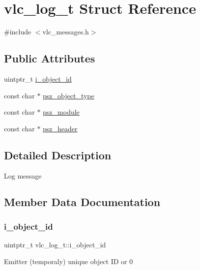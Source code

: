 \hypertarget{structvlc__log__t}{}\section{vlc\+\_\+log\+\_\+t Struct Reference}
\label{structvlc__log__t}


{\ttfamily \#include $<$vlc\+\_\+messages.\+h$>$}

\subsection*{Public Attributes}
\begin{DoxyCompactItemize}
\item 
uintptr\+\_\+t \hyperlink{structvlc__log__t_a742ac8cead7dd79a26c8b877f45507a1}{i\+\_\+object\+\_\+id}
\item 
const char $\ast$ \hyperlink{structvlc__log__t_aea2aa755a9ed0c56e001652408b16408}{psz\+\_\+object\+\_\+type}
\item 
const char $\ast$ \hyperlink{structvlc__log__t_a2c73720e584b561a452c897191234173}{psz\+\_\+module}
\item 
const char $\ast$ \hyperlink{structvlc__log__t_a4151d90ce089eac5a4853c9766f1e848}{psz\+\_\+header}
\end{DoxyCompactItemize}


\subsection{Detailed Description}
Log message 

\subsection{Member Data Documentation}
\mbox{\label{structvlc__log__t_a742ac8cead7dd79a26c8b877f45507a1}} 
\subsubsection{\texorpdfstring{i\+\_\+object\+\_\+id}{i\_object\_id}}
{\footnotesize\ttfamily uintptr\+\_\+t vlc\+\_\+log\+\_\+t\+::i\+\_\+object\+\_\+id}

Emitter (temporaly) unique object ID or 0 \mbox{\label{structvlc__log__t_a4151d90ce089eac5a4853c9766f1e848}} 
